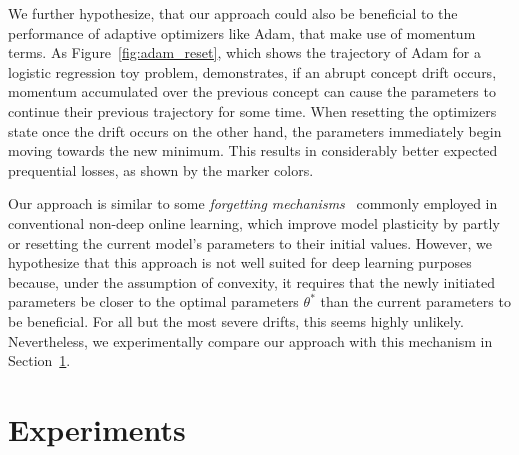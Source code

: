 \documentclass[letterpaper]{article} %
\begin{document}
We further hypothesize, that our approach could also be beneficial to the performance of adaptive optimizers like Adam, that make use of momentum terms.
As Figure~\ref{fig:adam_reset}, which shows the trajectory of Adam for a logistic regression toy problem, demonstrates, if an abrupt concept drift occurs, momentum accumulated over the previous concept can cause the parameters to continue their previous trajectory for some time.
When resetting the optimizers state once the drift occurs on the other hand, the parameters immediately begin moving towards the new minimum.
This results in considerably better expected prequential losses, as shown by the marker colors.

Our approach is similar to some \textit{forgetting mechanisms}~\cite{gamaSurveyConceptDrift2014} commonly employed in conventional non-deep online learning, which improve model plasticity by partly~\cite{bifetAdaptiveLearningEvolving2009} or resetting the current model's parameters to their initial values.
However, we hypothesize that this approach is not well suited for deep learning purposes because, under the assumption of convexity, it requires that the newly initiated parameters be closer to the optimal parameters $\theta^*$ than the current parameters to be beneficial.
For all but the most severe drifts, this seems highly unlikely.
Nevertheless, we experimentally compare our approach with this mechanism in Section~\ref{sec:experiments}.



\section{Experiments}\label{sec:experiments}
\end{document}
